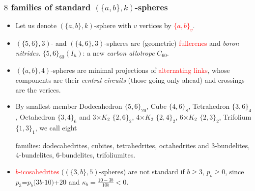 \documentclass{beamer}
\begin{document}
\begin{frame}\frametitle{$8$ families of standard $(\{a,b\},k)$-spheres}
\vspace{-3mm}
 \begin{itemize}

\item Let us denote $(\{a,b\},k)$-sphere with $v$ vertices by
\textcolor{red}{$\{a,b\}_v$}.




\item $(\{5,6\},3)$- and $(\{4,6\},3)$-spheres are  
(geometric) \textcolor{red}{fullerenes} and {\em boron nitrides}. 
$\{5,6\}_{60}(I_h)$: a new  {\em carbon allotrope} $C_{60}$.

\item $(\{a,b\},4)$-spheres are minimal projections of  
\textcolor{red}{alternating 
links}, 
whose
components are their  {\em central circuits} 
 (those going only ahead) and crossings are the verices.


\item By smallest member Dodecahedron $\{5,6\}_{20}$, Cube 
$\{4,6\}_8$, 
Tetrahedron $\{3,6\}_4$,   Octahedron 
$\{3,4\}_6$ and   $3$$\times $$K_2$ $\{2,6\}_2$, $4$$\times$$K_2$ 
$\{2,4\}_2$, 
$6$$\times $$K_2$ $\{2,3\}_2$,
 Trifolium  $\{1,3\}_1$, we call 
eight

families: dodecahedrites, 
cubites,  tetrahedrites, octahedrites and 
$3$-bundelites, $4$-bundelites,  
$6$-bundelites, trifoliumites. 
\item \textcolor{red}{$b$-icosahedrites} ($(\{3,b\},5)$-spheres)
are not 
standard if $b$$\ge$$3$, $p_b$$\ge$$0$, since $p_3$=$p_b(3b$-$10)$+$20$ and 
$\kappa_b=\frac{10-3b}{10b}<0$.
\end{itemize}
\end{frame}
\end{document}
